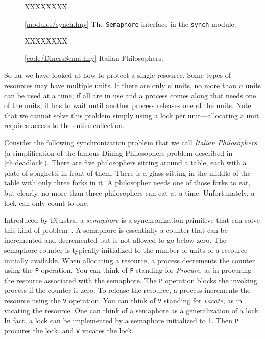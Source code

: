 \documentclass{report}
\newcommand{\harmonysource}[1]{
\begin{tabbing}
XX\=XXX\=XXX\kill
    
\end{tabbing}
}
\newcommand{\harmonylink}[1]{%
[\href{https://www.cs.cornell.edu/home/rvr/harmony/#1}{\underline{#1}}]%
}
\newenvironment{code}{
\tcolorbox
}{
\endtcolorbox
}
\begin{document}
\begin{figure}
\begin{code}
\harmonysource{semaphore}
\end{code}
\caption{\harmonylink{modules/synch.hny} The \texttt{Semaphore} interface in the \texttt{synch} module.}
\label{fig:semaphore}
\end{figure}

\begin{figure}
\begin{code}
\harmonysource{DinersSema}
\end{code}
\caption{\harmonylink{code/DinersSema.hny} Italian Philosophers.}
\label{fig:dinerssema}
\end{figure}

So far we have looked at how to protect a single resource.
Some types of resources may have multiple units.
If there are only $n$ units, no more than $n$ units can be used at a time;
if all are in use and a process comes along that needs one of the units,
it has to wait until another process releases one of the units.
Note that we cannot solve this problem simply using a lock per unit---allocating
a unit requires access to the entire collection.

Consider the following synchronization problem that we call
\emph{Italian Philosophers} (a simplification of
the famous Dining Philosophers problem described in \autoref{ch:deadlock}).
There are five philosophers sitting around a table, each with a plate of
spaghetti in front of them.
There is a glass sitting in the middle of the table with only
three forks in it.  A philosopher needs one of those forks to eat, but clearly,
no more than three philosophers can eat at a time.
Unfortunately, a lock can only count to one.

Introduced by Dijkstra,
a \emph{semaphore} is a synchronization primitive that
can solve this kind of problem~\cite{EWD35}.
A semaphore is essentially
a counter that can be incremented and decremented but is not allowed to go
below zero.  The semaphore counter is typically initialized to the number of
units of a resource initially available.
When allocating a resource, a process decrements the
counter using the \texttt{P}
%
%
operation.  You can think of \texttt{P} standing
for \emph{Procure}, as in procuring the resource associated with the semaphore.
The \texttt{P} operation blocks the invoking process if the counter is zero.
To release the resource, a process increments the resource using the
\texttt{V}
%
%
operation.  You can think of \texttt{V} standing for \emph{vacate},
as in vacating the resource.
One can think of a semaphore as a generalization of a lock.  In fact, a
lock can be implemented by a semaphore initialized to 1.  Then \texttt{P}
procures the lock, and \texttt{V} vacates the lock.
\end{document}
